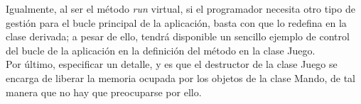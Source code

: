 Igualmente, al ser el método \emph{run} virtual, si el programador necesita otro tipo de gestión para el bucle principal de la aplicación, basta con que lo redefina en la clase derivada; a pesar de ello, tendrá disponible un sencillo ejemplo de control del bucle de la aplicación en la definición del método en la clase Juego.\\

Por último, especificar un detalle, y es que el destructor de la clase Juego se encarga de liberar la memoria ocupada por los objetos de la clase Mando, de tal manera que no hay que preocuparse por ello.

